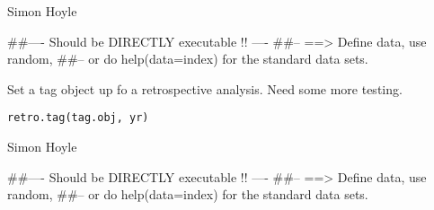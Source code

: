 \documentclass[a4paper]{book}
\begin{document}
%
\begin{Arguments}
\begin{ldescription}
\item[\code{frq.obj}] 


\item[\code{retro.tag.obj}] 


\end{ldescription}
\end{Arguments}
%
\begin{Author}\relax

Simon Hoyle
\end{Author}
%
\begin{Examples}
\begin{ExampleCode}
##---- Should be DIRECTLY executable !! ----
##-- ==>  Define data, use random,
##--	or do  help(data=index)  for the standard data sets.

\end{ExampleCode}
\end{Examples}
%
\begin{Description}\relax

Set a tag object up fo a retrospective analysis. Need some more testing. 
\end{Description}
%
\begin{Usage}
\begin{verbatim}
retro.tag(tag.obj, yr)
\end{verbatim}
\end{Usage}
%
\begin{Arguments}
\begin{ldescription}
\item[\code{tag.obj}] 


\item[\code{yr}] 


\end{ldescription}
\end{Arguments}
%
\begin{Author}\relax

Simon Hoyle
\end{Author}
%
\begin{Examples}
\begin{ExampleCode}
##---- Should be DIRECTLY executable !! ----
##-- ==>  Define data, use random,
##--	or do  help(data=index)  for the standard data sets.

\end{ExampleCode}
\end{Examples}
\end{document}
